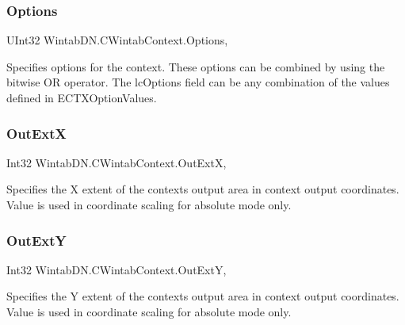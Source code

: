 \subsubsection{\texorpdfstring{Options}{Options}}
{\footnotesize\ttfamily U\+Int32 Wintab\+D\+N.\+C\+Wintab\+Context.\+Options\hspace{0.3cm}{\ttfamily [get]}, {\ttfamily [set]}}



Specifies options for the context. These options can be combined by using the bitwise OR operator. The lc\+Options field can be any combination of the values defined in E\+C\+T\+X\+Option\+Values. 

\mbox{\label{class_wintab_d_n_1_1_c_wintab_context_af911044cb67b004b35cca63883d598ae}} 
\subsubsection{\texorpdfstring{Out\+ExtX}{OutExtX}}
{\footnotesize\ttfamily Int32 Wintab\+D\+N.\+C\+Wintab\+Context.\+Out\+ExtX\hspace{0.3cm}{\ttfamily [get]}, {\ttfamily [set]}}



Specifies the X extent of the context\textquotesingle{}s output area in context output coordinates. Value is used in coordinate scaling for absolute mode only. 

\mbox{\label{class_wintab_d_n_1_1_c_wintab_context_aeb9155dbf8f387cfa2a38679b5af45a3}} 
\subsubsection{\texorpdfstring{Out\+ExtY}{OutExtY}}
{\footnotesize\ttfamily Int32 Wintab\+D\+N.\+C\+Wintab\+Context.\+Out\+ExtY\hspace{0.3cm}{\ttfamily [get]}, {\ttfamily [set]}}



Specifies the Y extent of the context\textquotesingle{}s output area in context output coordinates. Value is used in coordinate scaling for absolute mode only. 

